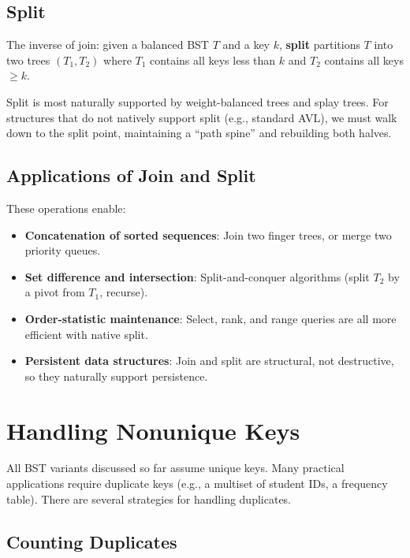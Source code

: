 \subsection{Split}
\label{sec:split-operation}

The inverse of join: given a balanced BST $T$ and a key $k$, \textbf{split} partitions $T$ into two trees $(T_1, T_2)$ where $T_1$ contains all keys less than $k$ and $T_2$ contains all keys $\geq k$.

Split is most naturally supported by weight-balanced trees and splay trees. For structures that do not natively support split (e.g., standard AVL), we must walk down to the split point, maintaining a ``path spine'' and rebuilding both halves.

\subsection{Applications of Join and Split}
\label{sec:join-split-apps}

These operations enable:
\begin{itemize}
    \item \textbf{Concatenation of sorted sequences}: Join two finger trees, or merge two priority queues.
    \item \textbf{Set difference and intersection}: Split-and-conquer algorithms (split $T_2$ by a pivot from $T_1$, recurse).
    \item \textbf{Order-statistic maintenance}: Select, rank, and range queries are all more efficient with native split.
    \item \textbf{Persistent data structures}: Join and split are structural, not destructive, so they naturally support persistence.
\end{itemize}

\section{Handling Nonunique Keys}
\label{sec:nonunique-keys}

All BST variants discussed so far assume unique keys. Many practical applications require duplicate keys (e.g., a multiset of student IDs, a frequency table). There are several strategies for handling duplicates.

\subsection{Counting Duplicates}
\label{sec:counting-duplicates}

